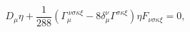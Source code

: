 \begin{equation}
\label{killspin}
D_\mu \eta + \frac{1}{288} \left( \Gamma_\mu^{\ \nu \sigma \kappa \xi}
- 8 \delta_\mu^\nu \Gamma^{\sigma\kappa\xi} \right) 
\eta F_{\nu\sigma\kappa\xi} = 0,
\end{equation}

